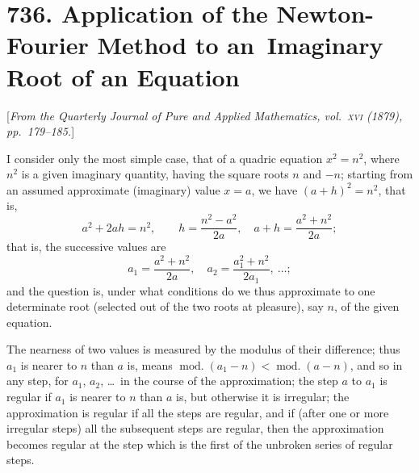 \documentclass[12pt,a4paper]{article}
\theoremstyle{plain}
\begin{document}
\newpage
\section*{736. Application of the Newton-Fourier Method to an\ Imaginary Root of an Equation}

[\textit{From the Quarterly Journal of Pure and Applied Mathematics, vol.~\textsc{xvi} (1879),
pp.~179--185.}]

I consider only the most simple case, that of a quadric equation
$x^2=n^2$, where $n^2$ is a given imaginary quantity, having the square
roots $n$ and $-n$; starting from an assumed approximate (imaginary) value
$x=a$, we have $(a+h)^2=n^2$, that is,
\[
a^2+2ah=n^2,\qquad h=\frac{n^2-a^2}{2a},\quad a+h=\frac{a^2+n^2}{2a};
\]
that is, the successive values are
\[
a_1=\frac{a^2+n^2}{2a},\quad a_2=\frac{a_1^2+n^2}{2a_1},\ \ldots;
\]
and the question is, under what conditions do we thus approximate to
one determinate root (selected out of the two roots at pleasure), say $n$,
of the given equation.

The nearness of two values is measured by the modulus of their
difference; thus $a_1$ is nearer to $n$ than $a$ is, means
$\operatorname{mod.}(a_1-n)<\operatorname{mod.}(a-n)$, and so in any step, for
$a_1$, $a_2$, \dots\ in the course of the approximation; the step $a$ to $a_1$
is regular if $a_1$ is nearer to $n$ than $a$ is, but otherwise it is irregular;
the approximation is regular if all the steps are regular, and if (after one
or more irregular steps) all the subsequent steps are regular, then the
approximation becomes regular at the step which is the first of the
unbroken series of regular steps.
\end{document}
